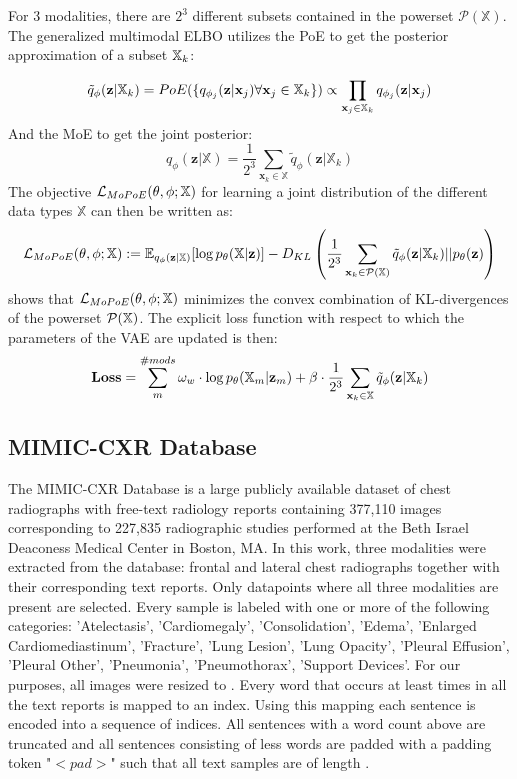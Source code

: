 For 3 modalities, there are $2^3$ different subsets contained in the powerset $\mathcal{P}(\mathbb{X})$. %
The generalized multimodal ELBO utilizes the PoE to get the posterior approximation of a subset $\mathbb{X}_k$:

\begin{equation}
    \tilde{q}_{\phi}(\textbf{z}|\mathbb{X}_k)=PoE(\{q_{\phi_j}(\textbf{z}|\textbf{x}_j) \forall \textbf{x}_j \in \mathbb{X}_k\}) \propto \prod _{\textbf{x}_j \in \mathbb{X}_k}q_{\phi_j}(\textbf{z}|\textbf{x}_j)
\end{equation}
And the MoE to get the joint posterior:
\begin{equation}
    q_{\phi}(\textbf{z}|\mathbb{X}) = \frac{1}{2^3} \sum _{\textbf{x}_k \in \mathbb{X}} \tilde{q}_{\phi} (\textbf{z}|\mathbb{X}_k)
\end{equation}
The objective $\mathcal{L}_{MoPoE}(\theta, \phi; \mathbb{X})$ for learning a joint distribution of the different data types $\mathbb{X}$ can then be written as:
\begin{equation}
    \mathcal{L}_{MoPoE}(\theta, \phi; \mathbb{X}) := \mathbb{E}_{q_{\phi}(\textbf{z}|\mathbb{X})}[\log p_{\theta}(\mathbb{X}|\textbf{z})] - D_{KL} \left( \frac{1}{2^3} \sum _{\textbf{x}_k \in \mathcal{P}(\mathbb{X})} \tilde{q}_{\phi} (\textbf{z}|\mathbb{X}_k)||p_{\theta}(\textbf{z})\right)
\end{equation}
\cite{thomas_gener-ELBO} shows that $\mathcal{L}_{MoPoE}(\theta, \phi; \mathbb{X})$ minimizes the convex combination of KL-divergences of the powerset $\mathcal{P}(\mathbb{X})$.
The explicit loss function with respect to which the parameters of the VAE are updated is then:
\begin{equation}
    \textbf{Loss} = \sum _m ^{\#mods} \omega _w \cdot \log p_{\theta}(\mathbb{X}_m|\textbf{z}_m) + \beta \cdot \frac{1}{2^3} \sum _{\textbf{x}_k \in \mathbb{X}} \tilde{q}_{\phi}(\textbf{z}|\mathbb{X}_k)
\end{equation}




\subsection{MIMIC-CXR Database}
The MIMIC-CXR Database \cite{johnson2019mimic} is a large publicly available dataset of chest radiographs with free-text radiology reports containing 377,110 images corresponding to 227,835 radiographic studies performed at the Beth Israel Deaconess Medical Center in Boston, MA.
In this work, three modalities were extracted from the database: frontal and lateral chest radiographs together with their corresponding text reports. Only datapoints where all three modalities are present are selected.
Every sample is labeled with one or more of the following categories: 'Atelectasis', 'Cardiomegaly', 'Consolidation', 'Edema', 'Enlarged Cardiomediastinum', 'Fracture', 'Lung Lesion', 'Lung Opacity', 'Pleural Effusion', 'Pleural Other', 'Pneumonia', 'Pneumothorax', 'Support Devices'.
For our purposes, all images were resized to \imgsize.
Every word that occurs at least \minwordocc times in all the text reports is mapped to an index.
Using this mapping each sentence is encoded into a sequence of indices.
All sentences with a word count above \sentlen are truncated and all sentences consisting of less words are padded with a padding token "$<pad>$" such that all text samples are of length \sentlen.

